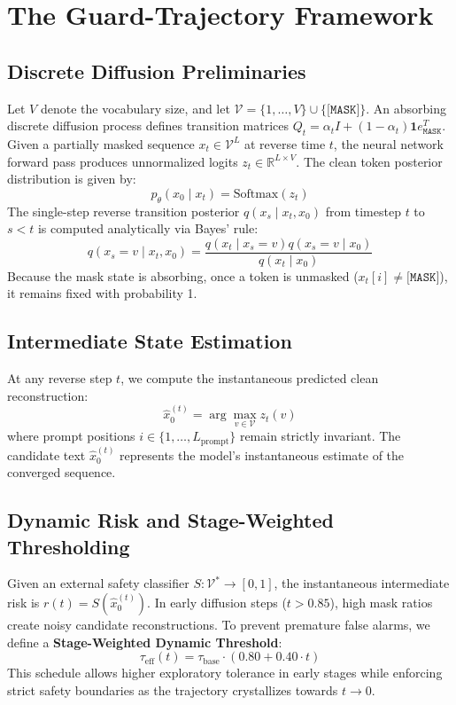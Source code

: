 \documentclass[11pt]{article}
\begin{document}
\section{The Guard-Trajectory Framework}

\subsection{Discrete Diffusion Preliminaries}
Let $V$ denote the vocabulary size, and let $\mathcal{V} = \{1, \dots, V\} \cup \{\texttt{[MASK]}\}$. An absorbing discrete diffusion process defines transition matrices $Q_t = \alpha_t I + (1 - \alpha_t) \mathbf{1} e_{\texttt{MASK}}^T$. Given a partially masked sequence $x_t \in \mathcal{V}^L$ at reverse time $t$, the neural network forward pass produces unnormalized logits $z_t \in \mathbb{R}^{L \times V}$. The clean token posterior distribution is given by:
\begin{equation}
p_\theta(x_0 \mid x_t) = \text{Softmax}(z_t)
\end{equation}
The single-step reverse transition posterior $q(x_s \mid x_t, x_0)$ from timestep $t$ to $s < t$ is computed analytically via Bayes' rule:
\begin{equation}
q(x_s = v \mid x_t, x_0) = \frac{q(x_t \mid x_s = v) q(x_s = v \mid x_0)}{q(x_t \mid x_0)}
\end{equation}
Because the mask state is absorbing, once a token is unmasked ($x_t[i] \ne \texttt{[MASK]}$), it remains fixed with probability 1.

\subsection{Intermediate State Estimation}
At any reverse step $t$, we compute the instantaneous predicted clean reconstruction:
\begin{equation}
\hat{x}_0^{(t)} = \arg\max_{v \in \mathcal{V}} z_t(v)
\end{equation}
where prompt positions $i \in \{1, \dots, L_{\text{prompt}}\}$ remain strictly invariant. The candidate text $\hat{x}_0^{(t)}$ represents the model's instantaneous estimate of the converged sequence.

\subsection{Dynamic Risk and Stage-Weighted Thresholding}
Given an external safety classifier $S: \mathcal{V}^* \to [0, 1]$, the instantaneous intermediate risk is $r(t) = S(\hat{x}_0^{(t)})$. In early diffusion steps ($t > 0.85$), high mask ratios create noisy candidate reconstructions. To prevent premature false alarms, we define a \textbf{Stage-Weighted Dynamic Threshold}:
\begin{equation}
\tau_{\text{eff}}(t) = \tau_{\text{base}} \cdot \left(0.80 + 0.40 \cdot t\right)
\end{equation}
This schedule allows higher exploratory tolerance in early stages while enforcing strict safety boundaries as the trajectory crystallizes towards $t \to 0$.
\end{document}
